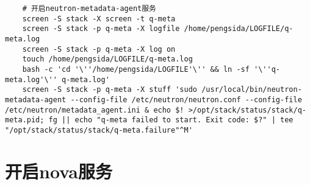 \documentclass[a4paper,left=1.5cm,right=1.5cm,11pt]{article}
\begin{document}
\begin{lstlisting}
	# 开启neutron-metadata-agent服务
	screen -S stack -X screen -t q-meta
	screen -S stack -p q-meta -X logfile /home/pengsida/LOGFILE/q-meta.log
    screen -S stack -p q-meta -X log on
	touch /home/pengsida/LOGFILE/q-meta.log
    bash -c 'cd '\''/home/pengsida/LOGFILE'\'' && ln -sf '\''q-meta.log'\'' q-meta.log'
	screen -S stack -p q-meta -X stuff 'sudo /usr/local/bin/neutron-metadata-agent --config-file /etc/neutron/neutron.conf --config-file /etc/neutron/metadata_agent.ini & echo $! >/opt/stack/status/stack/q-meta.pid; fg || echo "q-meta failed to start. Exit code: $?" | tee "/opt/stack/status/stack/q-meta.failure"^M'
	\end{lstlisting}

\section{开启nova服务}
\end{document}
